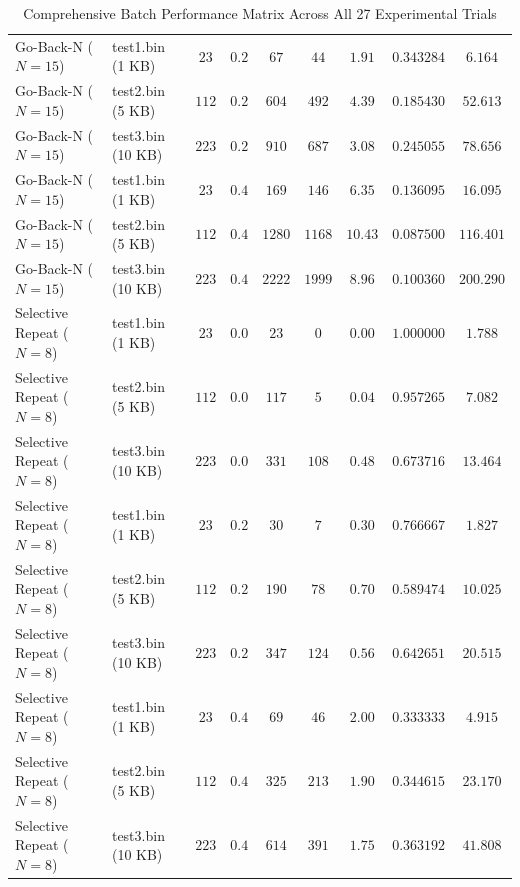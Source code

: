 \documentclass[11pt,a4paper]{article}
\begin{document}
\begin{table}[htbp]
\begin{tabular}{l l c c c c c c c}
\rowcolor{softblue!20} Go-Back-N ($N=15$) & test1.bin (1 KB) & $23$ & $0.2$ & $67$ & $44$ & $1.91$ & $0.343284$ & $6.164$ \\
\rowcolor{softblue!20} Go-Back-N ($N=15$) & test2.bin (5 KB) & $112$ & $0.2$ & $604$ & $492$ & $4.39$ & $0.185430$ & $52.613$ \\
\rowcolor{softblue!20} Go-Back-N ($N=15$) & test3.bin (10 KB) & $223$ & $0.2$ & $910$ & $687$ & $3.08$ & $0.245055$ & $78.656$ \\
\rowcolor{lightgold} Go-Back-N ($N=15$) & test1.bin (1 KB) & $23$ & $0.4$ & $169$ & $146$ & $6.35$ & $0.136095$ & $16.095$ \\
\rowcolor{lightgold} Go-Back-N ($N=15$) & test2.bin (5 KB) & $112$ & $0.4$ & $1280$ & $1168$ & $10.43$ & $0.087500$ & $116.401$ \\
\rowcolor{lightgold} Go-Back-N ($N=15$) & test3.bin (10 KB) & $223$ & $0.4$ & $2222$ & $1999$ & $8.96$ & $0.100360$ & $200.290$ \\
\hline
Selective Repeat ($N=8$) & test1.bin (1 KB) & $23$ & $0.0$ & $23$ & $0$ & $0.00$ & $1.000000$ & $1.788$ \\
Selective Repeat ($N=8$) & test2.bin (5 KB) & $112$ & $0.0$ & $117$ & $5$ & $0.04$ & $0.957265$ & $7.082$ \\
Selective Repeat ($N=8$) & test3.bin (10 KB) & $223$ & $0.0$ & $331$ & $108$ & $0.48$ & $0.673716$ & $13.464$ \\
\rowcolor{softblue!20} Selective Repeat ($N=8$) & test1.bin (1 KB) & $23$ & $0.2$ & $30$ & $7$ & $0.30$ & $0.766667$ & $1.827$ \\
\rowcolor{softblue!20} Selective Repeat ($N=8$) & test2.bin (5 KB) & $112$ & $0.2$ & $190$ & $78$ & $0.70$ & $0.589474$ & $10.025$ \\
\rowcolor{softblue!20} Selective Repeat ($N=8$) & test3.bin (10 KB) & $223$ & $0.2$ & $347$ & $124$ & $0.56$ & $0.642651$ & $20.515$ \\
\rowcolor{lightgold} Selective Repeat ($N=8$) & test1.bin (1 KB) & $23$ & $0.4$ & $69$ & $46$ & $2.00$ & $0.333333$ & $4.915$ \\
\rowcolor{lightgold} Selective Repeat ($N=8$) & test2.bin (5 KB) & $112$ & $0.4$ & $325$ & $213$ & $1.90$ & $0.344615$ & $23.170$ \\
\rowcolor{lightgold} Selective Repeat ($N=8$) & test3.bin (10 KB) & $223$ & $0.4$ & $614$ & $391$ & $1.75$ & $0.363192$ & $41.808$ \\
\bottomrule
\end{tabular}
\caption{Comprehensive Batch Performance Matrix Across All 27 Experimental Trials}
\label{tab:batch_results}
\end{table}
\end{document}
